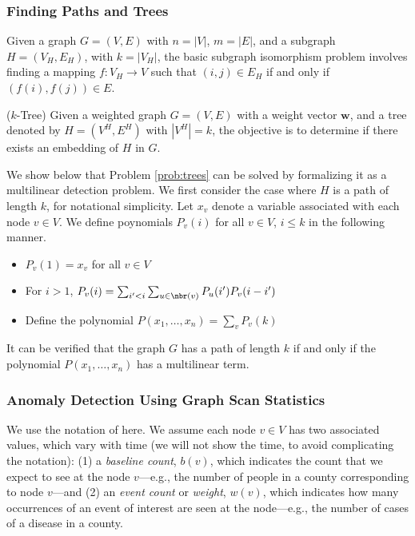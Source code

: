 \subsubsection{Finding Paths and Trees}
\label{sec:apps-trees}
Given a graph $G=(V, E)$ with $n=|V|$, $m=|E|$, and a subgraph $H=(V_H, E_H)$, with $k=|V_H|$, the basic subgraph isomorphism problem involves finding a mapping $f:V_H\rightarrow V$
such that $(i, j)\in E_H$ if and only if $(f(i), f(j))\in E$.

\begin{problem} ($k$-Tree)
\label{prob:trees}
Given a weighted graph $G=(V, E)$ with a weight vector $\mathbf{w}$, and a tree
denoted by $H=(V^H, E^H)$ with $|V^H|=k$, the objective is to determine if there exists
an embedding of $H$ in $G$.
\end{problem}

We show below that Problem \ref{prob:trees} can be solved by formalizing it as a multilinear detection problem. We first consider the case where $H$ is a path of length $k$, for notational simplicity. Let $x_v$ denote a variable associated with each node $v\in V$. We define poynomials $P_v(i)$ for all $v\in V$, $i\leq k$ in the following manner.
\begin{itemize}
\item
$P_v(1) = x_v$ for all $v\in V$
\item
For $i>1$,
$P_v(i) = \sum_{i'<i} \sum_{u\in\nbr(v)} P_u(i')P_v(i-i')$
\item
Define the polynomial $P(x_1,\ldots,x_n) = \sum_v P_v(k)$
\end{itemize}
It can be verified that the graph $G$ has a path of length $k$ if and only if the polynomial $P(x_1,\ldots,x_n)$ has a multilinear term.

\subsubsection{Anomaly Detection Using Graph Scan Statistics}
\label{sec:apps-scanstat}
We use the notation of \cite{cadena:sdm17} here. We assume each node $v\in V$ has two associated values,
which vary with time (we will not show the time, to avoid complicating the notation):
(1) a \emph{baseline count}, $b(v)$, which indicates the count that we
expect to see at the node $v$---e.g., the number of people in a county corresponding to node $v$---and
(2) an \emph{event count} or \emph{weight}, $w(v)$, which indicates how many occurrences of an event
of interest are seen at the node---e.g., the number of cases of a disease in a county.

